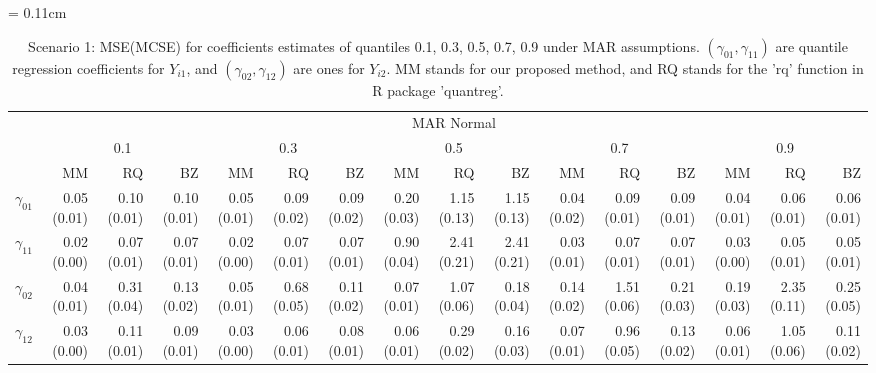 \documentclass[12pt]{article}
\begin{document}
\begin{landscape}
  \begin{table}[ht]
    \renewcommand{\arraystretch}{1.3}
    \scriptsize
    \centering
    \caption{Scenario 1: MSE(MCSE) for coefficients estimates of quantiles
      0.1, 0.3, 0.5, 0.7, 0.9 under MAR assumptions. $(\gamma_{01}, \gamma_{11})$
      are quantile regression coefficients for $Y_{i1}$, and $(\gamma_{02}, \gamma_{12})$
      are ones for $Y_{i2}$. MM stands for our proposed method, and RQ stands for the 'rq'
      function in R package 'quantreg'.}\label{tab:simh2}
    \vspace{10pt}
    \tabcolsep = 0.11cm
    \begin{tabular}{rrrrrrrrrrrrrrrr}
      \toprule
      & \multicolumn{15}{c}{MAR Normal} \\
      \cline{2-16}
      &  \multicolumn{3}{c}{0.1} &  \multicolumn{3}{c}{0.3} &  \multicolumn{3}{c}{0.5} &
      \multicolumn{3}{c}{0.7} &  \multicolumn{3}{c}{0.9} \\
      \cline{2-16}
      & MM   & RQ   & BZ   & MM   & RQ   & BZ   & MM   & RQ   & BZ   & MM   & RQ   & BZ   & MM   & RQ   & BZ   \\
      \hline
      $\gamma_{01}$ & 0.05 (0.01) & 0.10 (0.01) & 0.10 (0.01) & 0.05 (0.01) & 0.09 (0.02) & 0.09 (0.02) & 0.20 (0.03) & 1.15 (0.13) & 1.15 (0.13) & 0.04 (0.02) & 0.09 (0.01) & 0.09 (0.01) & 0.04 (0.01) & 0.06 (0.01) & 0.06 (0.01) \\
      $\gamma_{11}$ & 0.02 (0.00) & 0.07 (0.01) & 0.07 (0.01) & 0.02 (0.00) & 0.07 (0.01) & 0.07 (0.01) & 0.90 (0.04) & 2.41 (0.21) & 2.41 (0.21) & 0.03 (0.01) & 0.07 (0.01) & 0.07 (0.01) & 0.03 (0.00) & 0.05 (0.01) & 0.05 (0.01) \\
      $\gamma_{02}$ & 0.04 (0.01) & 0.31 (0.04) & 0.13 (0.02) & 0.05 (0.01) & 0.68 (0.05) & 0.11 (0.02) & 0.07 (0.01) & 1.07 (0.06) & 0.18 (0.04) & 0.14 (0.02) & 1.51 (0.06) & 0.21 (0.03) & 0.19 (0.03) & 2.35 (0.11) & 0.25 (0.05) \\
      $\gamma_{12}$ & 0.03 (0.00) & 0.11 (0.01) & 0.09 (0.01) & 0.03 (0.00) & 0.06 (0.01) & 0.08 (0.01) & 0.06 (0.01) & 0.29 (0.02) & 0.16 (0.03) & 0.07 (0.01) & 0.96 (0.05) & 0.13 (0.02) & 0.06 (0.01) & 1.05 (0.06) & 0.11 (0.02) \\
      \bottomrule
    \end{tabular}


\end{table}
\end{landscape}
\end{document}
